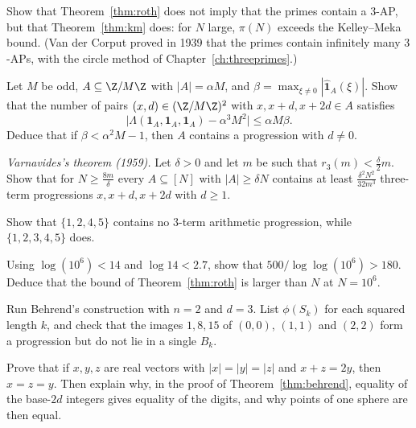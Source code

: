 \begin{exercise}[$\star$]\label{ex:primes}
Show that Theorem~\ref{thm:roth} does not imply that the primes contain a $3$-AP, but that Theorem~\ref{thm:km} does: for $N$ large, $\pi(N)$ exceeds the Kelley--Meka bound. (Van der Corput proved in 1939 that the primes contain infinitely many $3$-APs, with the circle method of Chapter~\ref{ch:threeprimes}.)
\end{exercise}

\begin{exercise}[$\star\star$]\label{ex:pseudo}
Let $M$ be odd, $A\subseteq\Z/M\Z$ with $|A|=\alpha M$, and $\beta=\max_{\xi\neq0}|\hat{\mathbf1}_A(\xi)|$. Show that the number of pairs $(x,d)\in(\Z/M\Z)^2$ with $x,x+d,x+2d\in A$ satisfies
\[
\bigl|\Lambda(\mathbf1_A,\mathbf1_A,\mathbf1_A)-\alpha^3M^2\bigr|\le\alpha M\beta.
\]
Deduce that if $\beta<\alpha^2M-1$, then $A$ contains a progression with $d\neq0$.
\end{exercise}

\begin{exercise}[$\star\star$]\label{ex:varnavides}
\emph{Varnavides's theorem (1959).} Let $\delta>0$ and let $m$ be such that $r_3(m)<\frac\delta2m$. Show that for $N\ge\frac{8m}\delta$ every $A\subseteq[N]$ with $|A|\ge\delta N$ contains at least $\frac{\delta^2N^2}{32m^3}$ three-term progressions $x,x+d,x+2d$ with $d\ge1$.
\end{exercise}

\begin{exercise}[$\star$]\label{ex:v14-extra-12-1}
Show that $\{1,2,4,5\}$ contains no $3$-term arithmetic progression, while $\{1,2,3,4,5\}$ does.
\end{exercise}

\begin{exercise}[$\star$]\label{ex:v14-extra-12-2}
Using $\log(10^6)<14$ and $\log14<2.7$, show that $500/\log\log(10^6)>180$. Deduce that the bound of Theorem~\ref{thm:roth} is larger than $N$ at $N=10^6$.
\end{exercise}

\begin{exercise}[$\star\star$]\label{ex:v14-extra-12-3}
Run Behrend's construction with $n=2$ and $d=3$. List $\phi(S_k)$ for each squared length $k$, and check that the images $1,8,15$ of $(0,0)$, $(1,1)$ and $(2,2)$ form a progression but do not lie in a single $B_k$.
\end{exercise}

\begin{exercise}[$\star\star\star$]\label{ex:v14-extra-12-4}
Prove that if $x,y,z$ are real vectors with $|x|=|y|=|z|$ and $x+z=2y$, then $x=z=y$. Then explain why, in the proof of Theorem~\ref{thm:behrend}, equality of the base-$2d$ integers gives equality of the digits, and why points of one sphere are then equal.
\end{exercise}

